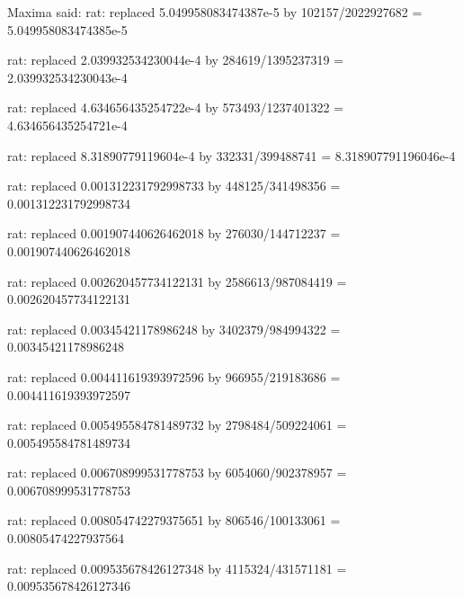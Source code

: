 \documentclass[a4paper,10pt]{article}
\begin{document}
\begin{eulernotebook}
\begin{eulercomment}
\begin{eulercomment}
\begin{eulercomment}
\begin{eulercomment}
\begin{eulercomment}
\begin{eulercomment}
\begin{eulercomment}
\begin{eulercomment}
\begin{eulercomment}
\begin{eulercomment}
\begin{eulercomment}
\begin{eulercomment}
\begin{eulercomment}
\begin{eulercomment}
\begin{eulercomment}
\begin{eulercomment}
\begin{euleroutput}
  Maxima said:
  rat: replaced 5.049958083474387e-5 by 102157/2022927682 = 5.049958083474385e-5
  
  rat: replaced 2.039932534230044e-4 by 284619/1395237319 = 2.039932534230043e-4
  
  rat: replaced 4.634656435254722e-4 by 573493/1237401322 = 4.634656435254721e-4
  
  rat: replaced 8.31890779119604e-4 by 332331/399488741 = 8.318907791196046e-4
  
  rat: replaced 0.001312231792998733 by 448125/341498356 = 0.001312231792998734
  
  rat: replaced 0.001907440626462018 by 276030/144712237 = 0.001907440626462018
  
  rat: replaced 0.002620457734122131 by 2586613/987084419 = 0.002620457734122131
  
  rat: replaced 0.00345421178986248 by 3402379/984994322 = 0.00345421178986248
  
  rat: replaced 0.004411619393972596 by 966955/219183686 = 0.004411619393972597
  
  rat: replaced 0.005495584781489732 by 2798484/509224061 = 0.005495584781489734
  
  rat: replaced 0.006708999531778753 by 6054060/902378957 = 0.006708999531778753
  
  rat: replaced 0.008054742279375651 by 806546/100133061 = 0.00805474227937564
  
  rat: replaced 0.009535678426127348 by 4115324/431571181 = 0.009535678426127346
  

\end{euleroutput}
\end{eulercomment}
\end{eulercomment}
\end{eulercomment}
\end{eulercomment}
\end{eulercomment}
\end{eulercomment}
\end{eulercomment}
\end{eulercomment}
\end{eulercomment}
\end{eulercomment}
\end{eulercomment}
\end{eulercomment}
\end{eulercomment}
\end{eulercomment}
\end{eulercomment}
\end{eulercomment}
\end{eulernotebook}
\end{document}
